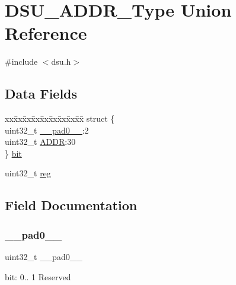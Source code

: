 \hypertarget{union_d_s_u___a_d_d_r___type}{}\section{D\+S\+U\+\_\+\+A\+D\+D\+R\+\_\+\+Type Union Reference}
\label{union_d_s_u___a_d_d_r___type}


{\ttfamily \#include $<$dsu.\+h$>$}

\subsection*{Data Fields}
\begin{DoxyCompactItemize}
\item 
\begin{tabbing}
xx\=xx\=xx\=xx\=xx\=xx\=xx\=xx\=xx\=\kill
struct \{\\
\>uint32\_t \mbox{\hyperlink{union_d_s_u___a_d_d_r___type_a3e57c2ef1c3ffb36722f000cc1156824}{\_\_pad0\_\_}}:2\\
\>uint32\_t \mbox{\hyperlink{union_d_s_u___a_d_d_r___type_ac9f49eaa00ec245d66e5342c02bcce9f}{ADDR}}:30\\
\} \mbox{\hyperlink{union_d_s_u___a_d_d_r___type_a292415e9c83fe025ff0f260ab8ee8e2c}{bit}}\\

\end{tabbing}\item 
uint32\+\_\+t \mbox{\hyperlink{union_d_s_u___a_d_d_r___type_a6b91636401516a477989a336376d7b40}{reg}}
\end{DoxyCompactItemize}


\subsection{Field Documentation}
\mbox{\label{union_d_s_u___a_d_d_r___type_a3e57c2ef1c3ffb36722f000cc1156824}} 
\subsubsection{\texorpdfstring{\_\_pad0\_\_}{\_\_pad0\_\_}}
{\footnotesize\ttfamily uint32\+\_\+t \+\_\+\+\_\+pad0\+\_\+\+\_\+}

bit\+: 0.. 1 Reserved \mbox{\label{union_d_s_u___a_d_d_r___type_ac9f49eaa00ec245d66e5342c02bcce9f}} 
